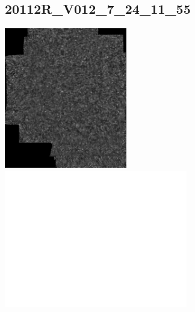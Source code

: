 \documentclass[11pt]{article}
\begin{document}
\subsection{20112R\_V012\_7\_24\_11\_55}
\includegraphics[width=0.40\textwidth, valign=m]{referenceframes/aoslo/20112R_V012_7_24_11_55_dwt_nostim_gamscaled_bandfilt_refframe.jpg}
\includegraphics[width=0.60\textwidth, valign=m]{eyepositiontraces/aoslo/20112R_V012_7_24_11_55.jpg}\\
\end{document}
